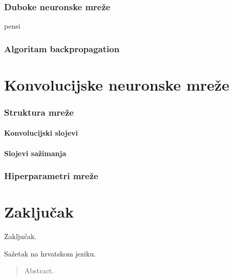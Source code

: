 \documentclass[times, utf8, zavrsni]{fer}
\begin{document}
\subsection{Duboke neuronske mreže}
pensi
\subsection{Algoritam backpropagation}


\chapter{Konvolucijske neuronske mreže}

\subsection{Struktura mreže}
\subsubsection{Konvolucijski slojevi}
\subsubsection{Slojevi sažimanja}
\subsection{Hiperparametri mreže}




\chapter{Zaključak}
Zaključak.




\begin{sazetak}
Sažetak na hrvatskom jeziku.

\end{sazetak}

\begin{abstract}
Abstract.

\end{abstract}
\end{document}
